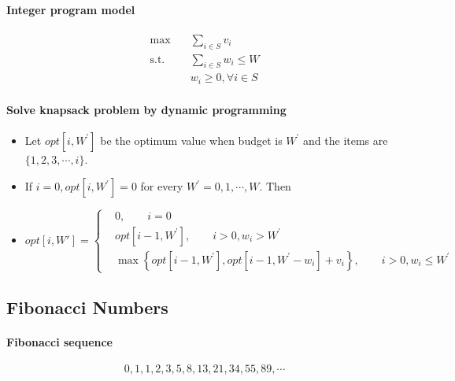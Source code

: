             \paragraph{Integer program model}
                \begin{align}
                    \max \quad & \sum_{i \in S} v_i\\
                    \text{s.t.} \quad & \sum_{i \in S} w_i \le W\\
                    & w_i \ge 0, \forall i \in S
                \end{align}

            \paragraph{Solve knapsack problem by dynamic programming}
                \begin{itemize}
                    \item Let $opt[i, W^\prime]$ be the optimum value when budget is $W^\prime$ and the items are $\{1, 2, 3, \cdots, i\}$.
                    \item If $i = 0, opt[i, W^\prime] = 0$ for every $W^\prime = 0, 1, \cdots, W$. Then
                    \item $opt[i, W'] = \begin{cases}
                        & 0, \qquad i = 0\\
                        & opt[i - 1, W^\prime], \qquad i > 0, w_i > W^\prime \\
                        & \max \left\{ opt[i - 1, W^\prime], opt[i - 1, W^\prime - w_i] + v_i \right\}, \qquad i > 0, w_i \le W^\prime
                    \end{cases}$
                \end{itemize}
                
        \subsection{Fibonacci Numbers}
            \paragraph{Fibonacci sequence}
                \begin{equation}
                    0, 1, 1, 2, 3, 5, 8, 13, 21, 34, 55, 89, \cdots
                \end{equation}

